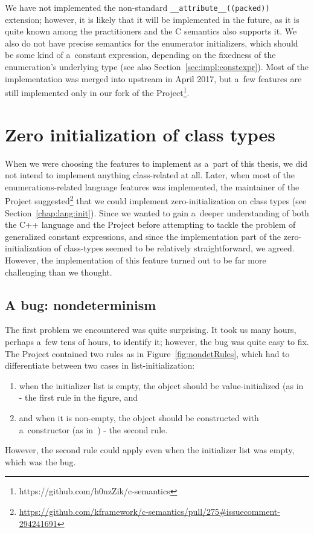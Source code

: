 \documentclass[nolot,nolof,nocover,printed]{fithesis3}
\newcommand{\Project}{Project\xspace}
\newcommand{\stdN}[2]{\cite[#2]{#1}\xspace}
\begin{document}
We have not implemented the non-standard \lstinline|__attribute__((packed))| extension; however, it is likely that it will be implemented in the future, as it is quite known among the practitioners and the C semantics also supports it. We also do not have precise semantics for the enumerator initializers, which should be some kind of a~constant expression, depending on the fixedness of the enumeration's underlying type (see also Section~\ref{sec:impl:constexpr}). Most of the implementation was merged into upstream in April 2017, but a~few features are still implemented only in our fork of the Project\footnote{https://github.com/h0nzZik/c-semantics}.

\section{Zero initialization of class types}\label{chp:implZeroInit}

When we were choosing the features to implement as a~part of this thesis, we did not intend to implement anything class-related at all. Later, when most of the enumerations-related language features was implemented, the maintainer of the \Project suggested\footnote{\url{https://github.com/kframework/c-semantics/pull/275\#issuecomment-294241691}}
that we could implement zero-initialization on class types (see Section~\ref{chap:lang:init}). Since we wanted to gain a~deeper understanding of both the C++ language and the \Project before attempting to tackle the problem of generalized constant expressions, and since the implementation part of the zero-initialization of class-types seemed to be relatively straightforward, we agreed. However, the implementation of this feature turned out to be far more challenging than we thought.

\subsection{A bug: nondeterminism}

The first problem we encountered was quite surprising. It took us many hours, perhaps a~few tens of hours, to identify it; however, the bug was quite easy to fix. The \Project contained two rules as in Figure~\ref{fig:nondetRules}, which had to differentiate between two cases in list-initialization:
\begin{enumerate}
\item when the initializer list is empty, the object should be value-initialized (as in~\stdN{n4296}{\S 8.5.4/3.4} - the first rule in the figure, and
\item and when it is non-empty, the object should be constructed with a~constructor (as in~\stdN{n4296}{\S 8.5.4/3.6}) - the second rule.
\end{enumerate}
However, the second rule could apply even when the initializer list was empty, which was the bug.
\end{document}
